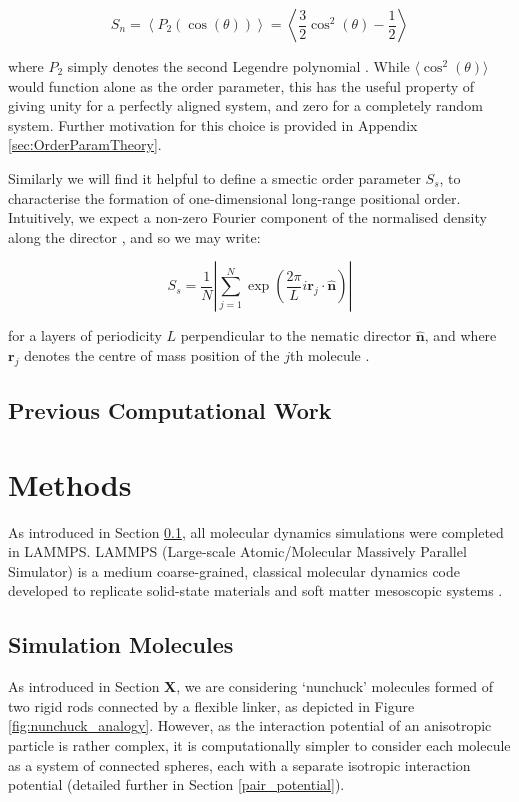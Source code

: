 \documentclass[11pt, a4paper]{article} %
\begin{document}
\begin{equation}
S_{n} = \left\langle P_{2}(\cos(\theta)) \right\rangle = \left\langle \frac{3}{2}\cos^{2}(\theta) - \frac{1}{2} \right\rangle 
\end{equation}

where $P_{2}$ simply denotes the second Legendre polynomial \cite{deGennes1993}. While $\langle \cos^{2}(\theta) \rangle$ would function alone as the order parameter, this has the useful property of giving unity for a perfectly aligned system, and zero for a completely random system. Further motivation for this choice is provided in Appendix \ref{sec:OrderParamTheory}.


Similarly we will find it helpful to define a smectic order parameter $S_{s}$, to characterise the formation of one-dimensional long-range positional order. Intuitively, we expect a non-zero Fourier component of the normalised density along the director \cite{Polson1997}, and so we may write:

\begin{equation}
S_{s} = \frac{1}{N} \left\lvert \sum_{j=1}^{N} \exp \left( {\frac{2\pi}{L}i\textbf{r}_{j} \cdot \boldsymbol{\hat{n}}} \right) \right\rvert
\end{equation}

for a layers of periodicity $L$ perpendicular to the nematic director $\boldsymbol{\hat{n}}$, and where $\textbf{r}_{j}$ denotes the centre of mass position of the $j$th molecule \cite{Dussi2018}.

\subsection{Previous Computational Work} \label{sec:PrevWork}

\section{Methods}
As introduced in Section \ref{sec:PrevWork}, all molecular dynamics simulations were completed in LAMMPS. LAMMPS (Large-scale Atomic/Molecular Massively Parallel Simulator) is a medium coarse-grained, classical molecular dynamics code developed to replicate  solid-state materials and soft matter mesoscopic systems \cite{Plimpton1995, LAMMPS}.



\subsection{Simulation Molecules}
As introduced in Section \textbf{X}, we are considering `nunchuck' molecules formed of two rigid rods connected by a flexible linker, as depicted in Figure \ref{fig:nunchuck_analogy}. However, as the interaction potential of an anisotropic particle is rather complex, it is computationally simpler to consider each molecule as a system of connected spheres, each with a separate isotropic interaction potential (detailed further in Section \ref{pair_potential}).
\end{document}

